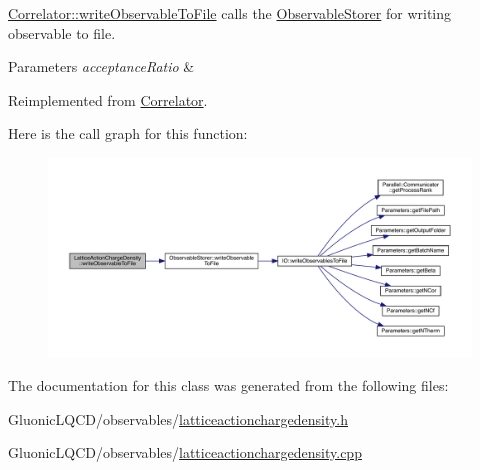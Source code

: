 \mbox{\hyperlink{class_correlator_a9e8d80e30e4fbe3b7fe57521538cb5ff}{Correlator\+::write\+Observable\+To\+File}} calls the \mbox{\hyperlink{class_observable_storer}{Observable\+Storer}} for writing observable to file. 


\begin{DoxyParams}{Parameters}
{\em acceptance\+Ratio} & \\
\hline
\end{DoxyParams}


Reimplemented from \mbox{\hyperlink{class_correlator_a9e8d80e30e4fbe3b7fe57521538cb5ff}{Correlator}}.

Here is the call graph for this function\+:\nopagebreak
\begin{figure}[H]
\begin{center}
\leavevmode
\includegraphics[width=350pt]{class_lattice_action_charge_density_a719f71aaccbf1b4147ea944781d69908_cgraph}
\end{center}
\end{figure}


The documentation for this class was generated from the following files\+:\begin{DoxyCompactItemize}
\item 
Gluonic\+L\+Q\+C\+D/observables/\mbox{\hyperlink{latticeactionchargedensity_8h}{latticeactionchargedensity.\+h}}\item 
Gluonic\+L\+Q\+C\+D/observables/\mbox{\hyperlink{latticeactionchargedensity_8cpp}{latticeactionchargedensity.\+cpp}}\end{DoxyCompactItemize}

